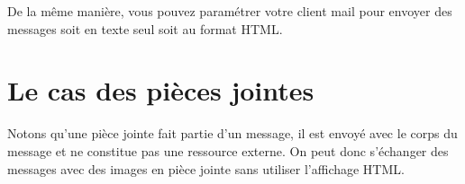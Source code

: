 \documentclass[12pt]{article}
\begin{document}
De la même manière, vous pouvez paramétrer votre client mail pour
envoyer des messages soit en texte seul soit au format HTML.

\section*{Le cas des pièces jointes}

Notons qu'une pièce jointe fait partie d'un message, il est envoyé
avec le corps du message et ne constitue pas une ressource externe. On
peut donc s'échanger des messages avec des images en pièce jointe sans
utiliser l'affichage HTML.
\end{document}

